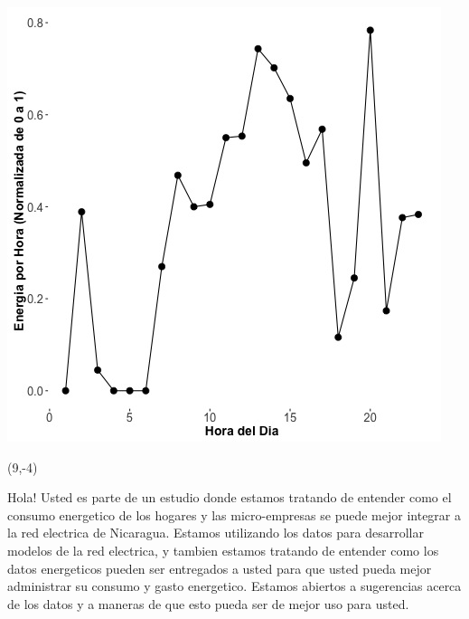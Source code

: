\documentclass{article}\usepackage[]{graphicx}\usepackage[]{color}
\newenvironment{knitrout}{}{} %
\begin{document}
\begin{knitrout}
\color{fgcolor}
\includegraphics[scale=0.75]{figure/A24_fplot_norm_median} 
\end{knitrout}

 \begin{textblock}{1}(9,-4)
\begin{minipage}{20em}
\begingroup

\endgroup
\end{minipage}
\end{textblock}

\vspace{70px}
\begin{knitrout}
Hola! Usted es parte de un estudio donde estamos tratando de entender como el consumo energetico de los hogares y las micro-empresas se puede mejor integrar a la red electrica de Nicaragua. Estamos utilizando los datos para desarrollar modelos de la red electrica, y tambien estamos tratando de entender como los datos energeticos pueden ser entregados a usted para que usted pueda mejor administrar su consumo y gasto energetico.  Estamos abiertos a sugerencias acerca de los datos y a maneras de que esto pueda ser de mejor uso para usted.
\end{knitrout}
\end{document}
